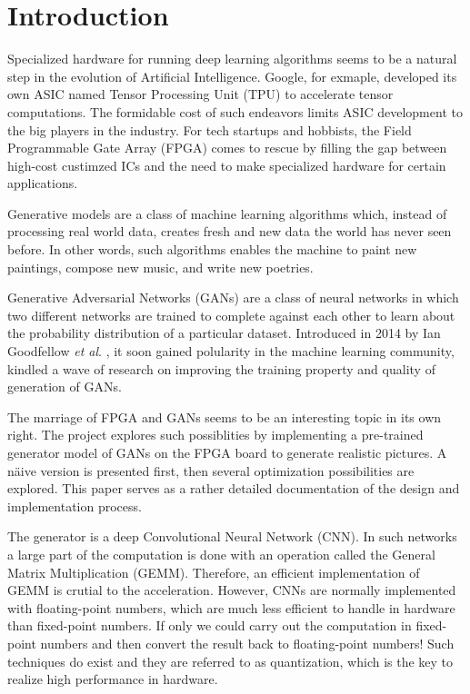 
\chapter{Introduction}

Specialized hardware for running deep learning algorithms seems to be a natural step in the evolution of
Artificial Intelligence.  Google, for exmaple, developed its own ASIC named Tensor Processing Unit (TPU)
to accelerate tensor computations. The formidable cost of such endeavors limits ASIC development to the big
players in the industry. For tech startups and hobbists, the Field Programmable Gate Array (FPGA) comes to
rescue by filling the gap between high-cost custimzed ICs and the need to make specialized hardware for certain
applications.

Generative models are a class of machine learning algorithms which, instead of processing real world data,
creates fresh and new data the world has never seen before. In other words, such algorithms enables
the machine to paint new paintings, compose new music, and write new poetries.

Generative Adversarial Networks (GANs) are a class of neural networks in which two different networks are
trained to complete against each other to learn about the probability distribution of a particular dataset.
Introduced in 2014 by Ian Goodfellow \textit{et al}. \cite{goodfellow:gan}, it soon gained polularity in the machine learning
community, kindled a wave of research on improving the training property and quality of generation of GANs.

The marriage of FPGA and GANs seems to be an interesting topic in its own right. The project explores such
possiblities by implementing a pre-trained generator model of GANs on the FPGA board to generate realistic
pictures. A näive version is presented first, then several optimization possibilities are explored. This
paper serves as a rather detailed documentation of the design and implementation process.

The generator is a deep Convolutional Neural Network (CNN). In such networks a large part of the computation is
done with an operation called the General Matrix Multiplication (GEMM). Therefore, an efficient implementation
of GEMM is crutial to the acceleration. However, CNNs are normally implemented with floating-point numbers,
which are much less efficient to handle in hardware than fixed-point numbers. If only we could carry out
the computation in fixed-point numbers and then convert the result back to floating-point numbers! Such
techniques do exist and they are referred to as quantization, which is the key to realize high performance
in hardware.

\clearpage %
